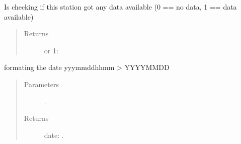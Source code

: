 \documentclass[letterpaper,10pt,english]{sphinxmanual}
\begin{document}
\begin{fulllineitems}
\begin{fulllineitems}
\end{fulllineitems}


\begin{fulllineitems}
\label{\detokenize{DwdDataPrep:DwdDataPrep.Station.check_data}}
\sphinxAtStartPar
{} Is checking if this station got any data available (0 == no data, 1 == data available)
\begin{quote}\begin{description}
\item[{Returns}] \leavevmode
{} or 1: 

\end{description}\end{quote}

\end{fulllineitems}


\begin{fulllineitems}
\label{\detokenize{DwdDataPrep:DwdDataPrep.Station.format_number_to_date}}
\sphinxAtStartPar
{} formating the date yyymmddhhmm \textendash{}\textgreater{} YYYY\sphinxhyphen{}MM\sphinxhyphen{}DD
\begin{quote}\begin{description}
\item[{Parameters}] \leavevmode
\sphinxAtStartPar
{} \textendash{} .

\item[{Returns}] \leavevmode
\sphinxAtStartPar
date: .

\end{description}\end{quote}

\end{fulllineitems}



\end{fulllineitems}
\end{document}
